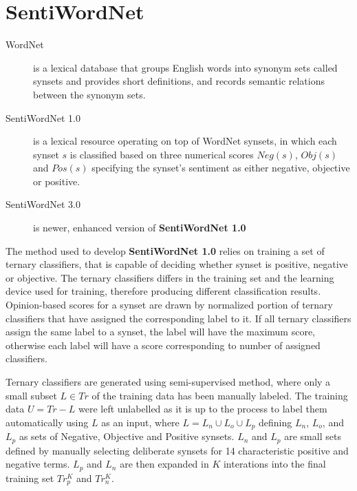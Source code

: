 \documentclass[a4paper,12pt]{article}
\begin{document}
  \section*{SentiWordNet}

  \begin{description}
    \item[WordNet] is a lexical database that groups English words into
    synonym sets called synsets and provides short definitions, and records
    semantic relations between the synonym sets.
          
    \item[SentiWordNet 1.0] is a lexical resource operating on top of WordNet
    synsets, in which each synset $s$ is classified based on three numerical
    scores $Neg(s)$, $Obj(s)$ and $Pos(s)$ specifying the synset's sentiment as
    either negative, objective or positive.

    \item[SentiWordNet 3.0] is newer, enhanced version of
    \textbf{SentiWordNet 1.0}
  \end{description}
     
  The method used to develop \textbf{SentiWordNet 1.0} relies on training a set
  of ternary classifiers, that is capable of deciding whether synset is
  positive, negative or objective. The ternary classifiers differs in the
  training set and the learning device used for training, therefore producing
  different classification results. Opinion-based scores for a synset are drawn
  by normalized portion of ternary classifiers that have assigned the
  corresponding label to it. If all ternary classifiers assign the same label to
  a synset, the label will have the maximum score, otherwise each label will
  have a score corresponding to number of assigned classifiers.

  Ternary classifiers are generated using semi-supervised method, where only a
  small subset $L \in Tr$ of the training data has been manually labeled. The
  training data $U = Tr - L$ were left unlabelled as it is up to the process to
  label them automatically using $L$ as an input, where
  $L = L_n \cup L_o \cup L_p$ defining $L_n$, $L_o$, and $L_p$ as sets of
  Negative, Objective and Positive synsets. $L_n$ and $L_p$ are small sets
  defined by manually selecting deliberate synsets for 14 characteristic
  positive and negative terms. $L_p$ and $L_n$ are then expanded in $K$
  interations into the final training set $Tr_{p}^{K}$ and $Tr_{n}^{K}$.

  \newpage
\end{document}
